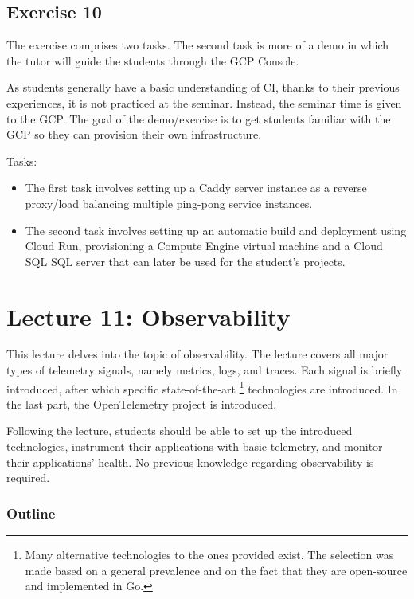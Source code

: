 \documentclass[
  digital,
  color,
  oneside,
  nosansbold,
  nocolorbold,
  lof,
  lot,
]{fithesis4}
\begin{document}
\subsection{Exercise 10}

The exercise comprises two tasks. The second task is more of a demo in which the tutor will guide the students through the GCP Console.

As students generally have a basic understanding of CI, thanks to their previous experiences, it is not practiced at the seminar. Instead, the seminar time is given to the GCP. The goal of the demo/exercise is to get students familiar with the GCP so they can provision their own infrastructure.

Tasks:
\begin{itemize}
    \item The first task involves setting up a Caddy server instance as a reverse proxy/load balancing multiple ping-pong service instances.
    \item The second task involves setting up an automatic build and deployment using Cloud Run, provisioning a Compute Engine virtual machine and a Cloud SQL SQL server that can later be used for the student's projects.
\end{itemize}
    
\section{Lecture 11: Observability}

This lecture delves into the topic of observability. The lecture covers all major types of telemetry signals, namely metrics, logs, and traces. Each signal is briefly introduced, after which specific state-of-the-art \footnote{Many alternative technologies to the ones provided exist. The selection was made based on a general prevalence and on the fact that they are open-source and implemented in Go.}
technologies are introduced. In the last part, the OpenTelemetry project is introduced.

Following the lecture, students should be able to set up the introduced technologies, instrument their applications with basic telemetry, and monitor their applications' health. No previous knowledge regarding observability is required.

\subsubsection{Outline}
\end{document}
